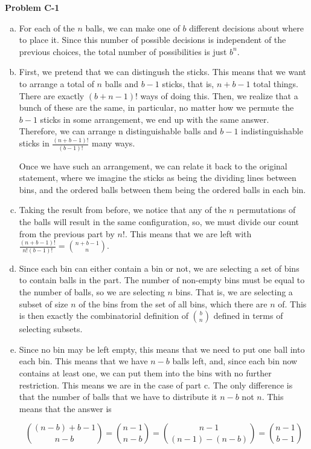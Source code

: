 \documentclass{article}
\begin{document}
\noindent\textbf{Problem C-1}\\
\begin{enumerate}[a.]
\item For each of the $n$ balls, we can make one of $b$ different decisions about where to place it. Since this number of possible decisions is independent of the previous choices, the total number of possibilities is just $b^n$.
\item 	
First, we pretend that we can distingush the sticks. This means that we want to arrange a total of $n$ balls and $b-1$ sticks, that is, $n+b-1$ total things. There are exactly $(b+n-1)!$ ways of doing this. Then, we realize that a bunch of these are the same, in particular, no matter how we permute the $b-1$ sticks in some arrangement, we end up with the same answer. Therefore, we can arrange n distinguishable balls and $b-1$ indistinguishable sticks in $\frac{(n+b-1)!}{(b-1)!}$ many ways.

Once we have such an arrangement, we can relate it back to the original statement, where we imagine the sticks as being the dividing lines between bins, and the ordered balls between them being the ordered balls in each bin.
\item
Taking the result from before, we notice that any of the $n$ permutations of the balls will result in the same configuration, so, we must divide our count from the previous part by $n!$. This means that we are left with $\frac{(n+b-1)!}{n!(b-1)!} = \binom{n+b-1}{n}$.
\item
Since each bin can either contain a bin or not, we are selecting a set of bins to contain balls in the part. The number of non-empty bins must be equal to the number of balls, so we are selecting $n$ bins. That is, we are selecting a subset of size $n$ of the bins from the set of all bins, which there are $n$ of. This is then exactly the combinatorial definition of $\binom{b}{n}$ defined in terms of selecting subsets.
\item
Since no bin may be left empty, this means that we need to put one ball into each bin. This means that we have $n-b$ balls left, and, since each bin now contains at least one, we can put them into the bins with no further restriction. This means we are in the case of part c. The only difference is that the number of balls that we have to distribute it $n-b$ not $n$. This means that the answer is

\[
\binom{(n-b)+b-1}{n-b} = \binom{n-1}{n-b} = \binom{n-1}{(n-1)-(n-b)} = \binom{n-1}{b-1}
\]
\end{enumerate}
\end{document}
